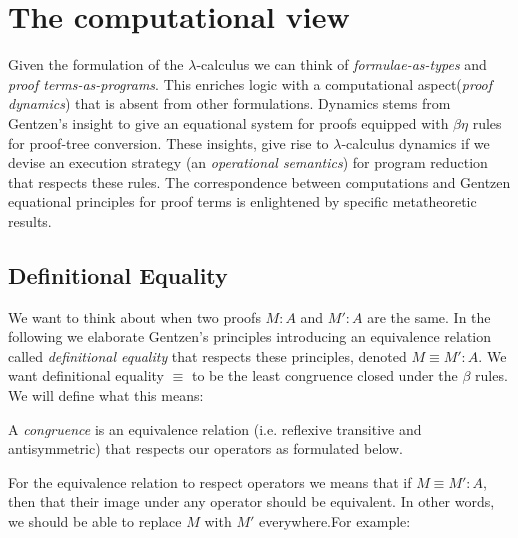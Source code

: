 \section{The computational view}
Given the formulation of the $\lambda$-calculus we can think of \emph{formulae-as-types} and \textit{proof terms-as-programs}. This enriches logic with a computational aspect(\emph{proof dynamics}) that is absent from other formulations. Dynamics stems from Gentzen's insight to give an equational system for proofs equipped with $\beta$$\eta$ rules for proof-tree conversion. These insights, give rise to $\lambda$-calculus dynamics if we devise an execution strategy (an \emph{operational semantics}) for program reduction that respects these rules. The correspondence between computations and Gentzen equational principles for proof terms is enlightened by specific metatheoretic results.

\subsection{Definitional Equality}

We want to think about when two proofs $M:A$ and $M':A$ are the same. In the following  we elaborate Gentzen's principles introducing an equivalence relation called \emph{definitional equality} that respects these principles, denoted $M\equiv M':A$. We want definitional equality $\equiv$ to be the least congruence closed under the $\beta$ rules. We will define what this means:

A \emph{congruence} is an equivalence relation (i.e. reflexive transitive and antisymmetric) that respects our operators as formulated below. 

\begin{mdframed}

\end{mdframed}

For the equivalence relation to respect operators we  means that if $M\equiv M':A$, then that their image under any operator should be equivalent. In other words, we should be able to replace $M$ with $M'$ everywhere.For example:

